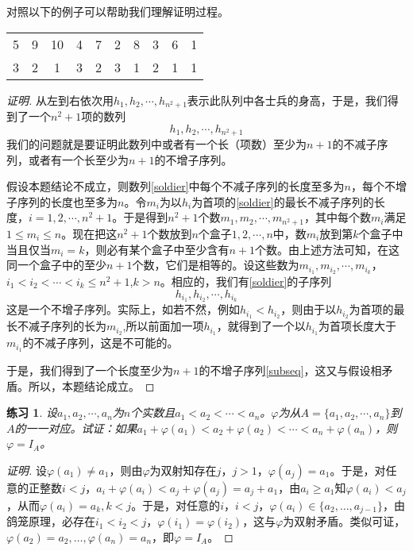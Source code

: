 \documentclass{book}[oneside]
\newtheorem{Exercise}{练习}[chapter]
\begin{document}
\begin{CJK*}{UTF8}{gbsn}
  
  对照以下的例子可以帮助我们理解证明过程。

    \begin{tabular}{cccccccccc}
5& 9& 10& 4& 7& 2& 8& 3& 6& 1\\
3& 2& 1&  3& 2& 3& 1& 2& 1& 1\\
  \end{tabular}

  \begin{proof}[证明]
    从左到右依次用$h_1, h_2, \cdots, h_{n^2+1}$表示此队列中各士兵的身高，于是，我们得到了一个$n^2+1$项的数列
    \begin{equation}\label{soldier}
      h_1,h_2,\cdots, h_{n^2+1}
    \end{equation}
    我们的问题就是要证明此数列中或者有一个长（项数）至少为$n+1$的不减子序列，或者有一个长至少为$n+1$的不增子序列。

    假设本题结论不成立，则数列\eqref{soldier}中每个不减子序列的长度至多为$n$，每个不增子序列的长度也至多为$n$。令$m_i$为以$h_i$为首项的\eqref{soldier}的最长不减子序列的长度，$i=1,2,\cdots, n^2+1$。于是得到$n^2+1$个数$m_1,m_2,\cdots,m_{n^2+1}$，其中每个数$m_i$满足$1\leq m_i \leq n$。现在把这$n^2+1$个数放到$n$个盒子$1,2,\cdots,n$中，数$m_i$放到第$k$个盒子中当且仅当$m_i=k$，则必有某个盒子中至少含有$n+1$个数。由上述方法可知，在这同一个盒子中的至少$n+1$个数，它们是相等的。设这些数为$m_{i_1},m_{i_2},\cdots, m_{i_k}$，$i_1<i_2<\cdots<i_k\leq n^2+1$,$k>n$。相应的，我们有\eqref{soldier}的子序列
    \begin{equation}\label{subseq}
    h_{i_1}, h_{i_2}, \cdots, h_{i_k}      
    \end{equation}
    这是一个不增子序列。实际上，如若不然，例如$h_{i_1} < h_{i_2}$，则由于以$h_{i_2}$为首项的最长不减子序列的长为$m_{i_2}$,所以前面加一项$h_{i_1}$，就得到了一个以$h_{i_1}$为首项长度大于$m_{i_1}$的不减子序列，这是不可能的。

    于是，我们得到了一个长度至少为$n+1$的不增子序列\eqref{subseq}，这又与假设相矛盾。所以，本题结论成立。
  \end{proof}
  \begin{Exercise}
    设$a_1, a_2, \cdots, a_n$为$n$个实数且$a_1<a_2<\cdots <a_n$。$\varphi$为从$A=\{a_1,a_2,\cdots,a_n\}$到$A$的一一对应。试证：如果$a_1+\varphi(a_1)<a_2+\varphi(a_2)<\cdots < a_n+\varphi(a_n)$，则$\varphi = I_A$。
   \end{Exercise}
  \begin{proof}[证明]
    设$\varphi(a_1)\neq a_1$，则由$\varphi$为双射知存在$j$，$j>1$，$\varphi(a_j)=a_1$。于是，对任意的正整数$i<j$，$a_i+\varphi(a_i)<a_j+\varphi(a_j)=a_j+a_1$，由$a_i\geq a_1$知$\varphi(a_i)< a_j$，从而$\varphi(a_i)=a_k,k<j$。于是，对任意的$i$，$i<j$，$\varphi(a_i)\in \{a_2,\ldots,a_{j-1}\}$，由鸽笼原理，必存在$i_1<i_2<j$，$\varphi(i_1)=\varphi(i_2)$，这与$\varphi$为双射矛盾。类似可证，$\varphi(a_2)=a_2,\ldots,\varphi(a_n)=a_n$，即$\varphi = I_A$。
  

\end{proof}
\end{CJK*}
\end{document}
